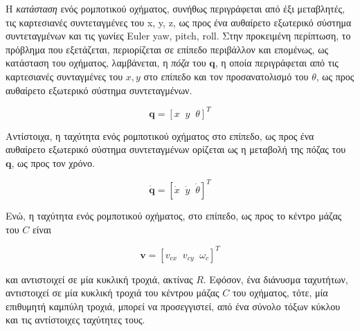 \bigskip
Η \textit{κατάσταση} ενός ρομποτικού οχήματος, συνήθως περιγράφεται από έξι μεταβλητές, τις καρτεσιανές συντεταγμένες του x, y, z, ως προς ένα αυθαίρετο εξωτερικό σύστημα συντεταγμένων και τις {γωνίες Euler yaw, pitch, roll}. Στην προκειμένη περίπτωση, το πρόβλημα που εξετάζεται, περιορίζεται σε επίπεδο περιβάλλον και επομένως, ως {κατάσταση} του οχήματος, λαμβάνεται, η \textit{πόζα} του $\mathbf{q}$, η οποία περιγράφεται από τις καρτεσιανές συνταγμένες του $x, y$ στο επίπεδο και τον προσανατολισμό του $\theta$, ως προς αυθαίρετο εξωτερικό σύστημα συντεταγμένων.

\begin{equation}
	\textbf{q} = [x\;\; y\;\; \theta]^T
	\label{eq:pose}
\end{equation}

\bigskip
Αντίστοιχα, η ταχύτητα ενός ρομποτικού οχήματος στο επίπεδο, ως προς ένα αυθαίρετο εξωτερικό σύστημα συντεταγμένων ορίζεται ως η μεταβολή της {πόζας} του $\mathbf{q}$, ως προς τον χρόνο.

\begin{equation}
	\dot{\mathbf{q}} = [\dot x\;\; \dot y\;\; \dot \theta]^T
	\label{eq:dpose}
\end{equation}

\bigskip
\noindent
Ενώ, η ταχύτητα ενός ρομποτικού οχήματος, στο επίπεδο, ως προς το κέντρο μάζας του $C$ είναι

\begin{equation}
	 \textbf{v} = [v_{cx}\;\; v_{cy}\;\; \omega_c]^T
	\label{eq:speed}
\end{equation}

\bigskip
\noindent
και αντιστοιχεί σε μία κυκλική τροχιά, ακτίνας $R$. Εφόσον, ένα διάνυσμα ταχυτήτων, αντιστοιχεί σε μία κυκλική τροχιά του κέντρου μάζας $C$ του οχήματος, τότε, μία επιθυμητή καμπύλη τροχιά, μπορεί να προσεγγιστεί, από ένα σύνολο τόξων κύκλου και τις αντίστοιχες  ταχύτητες τους.

\bigskip
